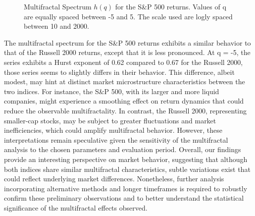 \documentclass[11pt]{extarticle}
\begin{document}
\begin{figure}[htbp]
    \centering
    \caption{Multifractal Spectrum $h(q)$ for the S\&P 500 returns. Values of q are equally spaced between -5 and 5.
    The scale used are logly spaced between 10 and 2000.}
\end{figure}

\FloatBarrier

The multifractal spectrum for the S\&P 500 returns exhibits a similar behavior to that of the Russell 2000 returns,
except that it is less pronounced. At q = -5, the series exhibits a Hurst exponent of 0.62 compared to 0.67 for the
Russell 2000, those series seems to slightly differs in their behavior.
This difference, albeit modest, may hint at distinct market microstructure characteristics between the two indices.
For instance, the S\&P 500, with its larger and more liquid companies, might experience a smoothing effect on return
dynamics that could reduce the observable multifractality. In contrast, the Russell 2000, representing smaller-cap
stocks, may be subject to greater fluctuations and market inefficiencies, which could amplify multifractal behavior.
However, these interpretations remain speculative given the sensitivity of the multifractal analysis to the chosen
parameters and evaluation period.
Overall, our findings provide an interesting perspective on market behavior, suggesting that although both indices
share similar multifractal characteristics, subtle variations exist that could reflect underlying market differences.
Nonetheless, further analysis incorporating alternative methods and longer timeframes is required to robustly confirm
these preliminary observations and to better understand the statistical significance of the multifractal effects observed.
\end{document}
